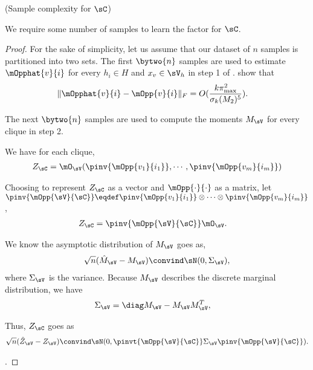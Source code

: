 \begin{lemma}(Sample complexity for $\sC$)
  
We require some number of samples to learn the factor for $\sC$.
\end{lemma}
\begin{proof}

For the sake of simplicity, let us assume that our dataset of $n$
  samples is partitioned into two sets.
  The first $\bytwo{n}$ samples are used to estimate $\mOpphat{v}{i}$ for
  every $h_i \in H$ and $x_v \in \sV_{h}$ in step 1 of .
\citet{anandkumar13tensor} show that 
\begin{align*}
  \|\mOpphat{v}{i} - \mOpp{v}{i}\|_F &= O( \frac{k \pi_{\max}^2}{\sigma_k(M_2)^5} ). 
\end{align*}

The next $\bytwo{n}$ samples are used to compute the moments $M_\sV$ for
  every clique in step 2.

We have for each clique,
\begin{align*}
  Z_{\sC} &= \mO_\sV(\pinv{\mOpp{v_1}{i_1}},\cdots,\pinv{\mOpp{v_m}{i_m}}) \\
\end{align*}

Choosing to represent $Z_\sC$ as a vector and $\mOpp{\cdot}{\cdot}$ as a matrix,
let $\pinv{\mOpp{\sV}{\sC}} \eqdef \pinv{\mOpp{v_1}{i_1}} \otimes \cdots \otimes \pinv{\mOpp{v_m}{i_m}}$,
\begin{align*}
  Z_{\sC} &= \pinv{\mOpp{\sV}{\sC}} \mO_\sV.
\end{align*}

We know the asymptotic distribution of $M_\sV$ goes as,
\begin{align*}
  \sqrt{n}(\hat M_\sV - M_\sV) \convind \sN(0, \Sigma_\sV),
\end{align*}
where $\Sigma_\sV$ is the variance. Because $M_\sV$ describes the discrete marginal distribution, we have 
\begin{align*}
  \Sigma_\sV &= \diag  M_\sV  - M_\sV M_\sV^T,
\end{align*}

Thus, $Z_\sC$ goes as
\begin{align*}
  \sqrt{n}(\hat Z_\sV - Z_\sV) \convind \sN(0, \pinvt{\mOpp{\sV}{\sC}} \Sigma_\sV \pinv{\mOpp{\sV}{\sC}}).
\end{align*}

.

\end{proof}

